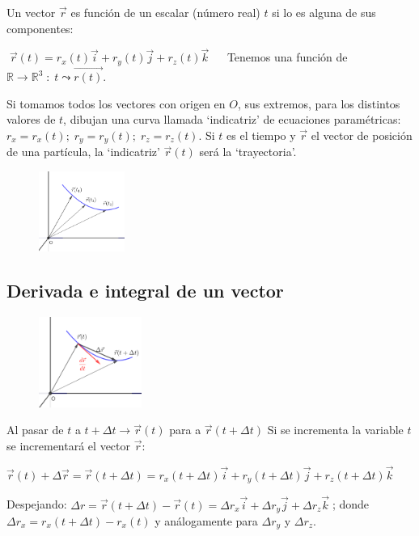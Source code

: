 \begin{multicols}{2}
Un vector $\vec r$ es función de un escalar (número real) $t$ si lo es alguna de sus componentes:

$\boxed{ \; \vec r(t)=r_x(t) \vec i + r_y(t) \vec j + r_z(t) \vec k \; } \quad$
Tenemos una función de $\mathbb R \to \mathbb R^3\; : \; t \leadsto \vec {r(t)}$. 

Si tomamos todos los vectores con origen en $O$, sus extremos, para los distintos valores de $t$, dibujan una curva llamada `indicatriz' de ecuaciones paramétricas: $r_x=r_x(t); \; r_y=r_y(t); \; r_z=r_z(t)$. Si $t$ es el tiempo y $\vec r$ el vector de posición de una partícula, la `indicatriz' $ \vec r (t)$ será la `trayectoria'.

	\begin{figure}[H]
	\centering
	\includegraphics[width=0.25\textwidth]{imagenes/imagenescv/T10IM17.png}
	\end{figure}
\end{multicols}

\subsection{Derivada e integral de un vector}

\begin{multicols}{2}
	\begin{figure}[H]
	\centering
	\includegraphics[width=0.3\textwidth]{imagenes/imagenescv/T10IM18.png}
	\end{figure}
Al pasar de $t$ a $t+ \Delta t \to \vec r (t)$ para a $\vec r (t+\Delta t)$ Si se incrementa la variable $t$ se incrementará el vector $\vec r$:

$\vec r (t) + \Delta \vec r = \vec r (t+\Delta t) = r_x (t+\Delta t) \vec i + r_y (t+\Delta t) \vec j + r_z (t+\Delta t) \vec k$

Despejando: $\Delta r =\vec r (t+\Delta t) - \vec r (t) = \Delta r_x \vec i +\Delta r_y \vec j +\Delta r_z \vec k \; $;  donde $\Delta r_x =  r_x (t+\Delta t) -  r_x (t) $ y análogamente para $\Delta r_y$ y $\Delta r_z$.
\end{multicols}

